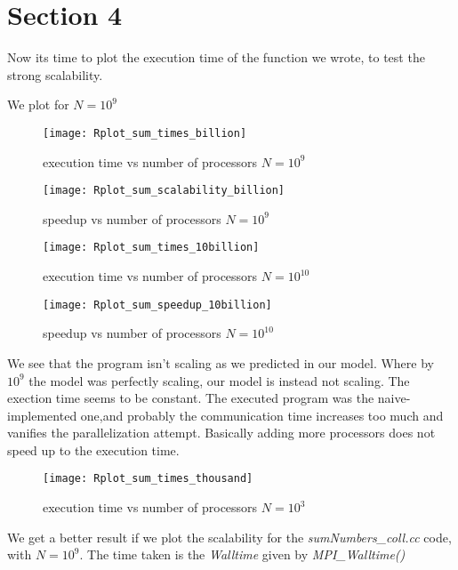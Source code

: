 \documentclass[11pt]{scrartcl} %
\begin{document}
\section{Section 4}
Now its time to plot the execution time of the function we wrote, to test the strong scalability.

We plot for $N=10^9$

\begin{figure}[H] %
	\centering
	\texttt{[image: Rplot\_sum\_times\_billion]} %
	\caption{execution time vs number of processors $N= 10^9$}
\end{figure}
\begin{figure}[H] %
	\centering
	\texttt{[image: Rplot\_sum\_scalability\_billion]} %
	\caption{speedup vs number of processors $N= 10^9$}
\end{figure}

\begin{figure}[H] %
	\centering
	\texttt{[image: Rplot\_sum\_times\_10billion]} %
	\caption{execution time vs number of processors $N= 10^{10}$}
\end{figure}
\begin{figure}[H] %
	\centering
	\texttt{[image: Rplot\_sum\_speedup\_10billion]} %
	\caption{speedup vs number of processors $N= 10^{10}$}
\end{figure}

We see that the program isn't scaling as we predicted in our model.
Where by $10^9$ the model was perfectly scaling, our model is instead not scaling.
The exection time seems to be constant.
The executed program was the naive-implemented one,and probably the communication time increases too much and vanifies the parallelization attempt.
Basically adding more processors does not speed up to the execution time.
\begin{figure}[H] %
	\centering
	\texttt{[image: Rplot\_sum\_times\_thousand]} %
	\caption{execution time vs number of processors $N= 10^3$}
\end{figure}
We get a better result if we plot the scalability for the \textit{sumNumbers\_coll.cc} code, with $N=10^{9}$. The time taken is the \textit{Walltime} given by \textit{MPI\_Walltime()}
\end{document}
